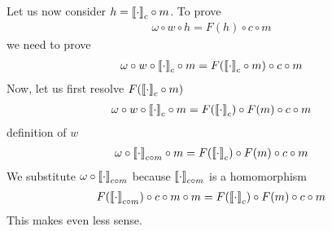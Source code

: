 Let us now consider $h={{\llbracket\cdot\rrbracket}}_{c}\circ m$. To prove
\begin{align}
    \omega \circ w \circ h = F(h)\circ c\circ m
\end{align}  
we need to prove 
\begin{align}
    \omega \circ w \circ {{\llbracket\cdot\rrbracket}}_{c}\circ m = F({{\llbracket\cdot\rrbracket}}_{c}\circ m)\circ c\circ m
\end{align}
Now, let us first resolve $F({{\llbracket\cdot\rrbracket}}_{c}\circ m)$
\begin{align}
    \omega \circ w \circ {{\llbracket\cdot\rrbracket}}_{c}\circ m = F({{\llbracket\cdot\rrbracket}}_{c})\circ F(m)\circ c\circ m
\end{align}
definition of $w$
\begin{align}
    \omega \circ{{\llbracket\cdot\rrbracket}}_{c\circ m}\circ m = F({{\llbracket\cdot\rrbracket}}_{c})\circ F(m)\circ c\circ m
\end{align}
We substitute $ \omega \circ{{\llbracket\cdot\rrbracket}}_{c\circ m}$ because ${{\llbracket\cdot\rrbracket}}_{c\circ m}$ is a homomorphism
\begin{align}
    F({{\llbracket\cdot\rrbracket}}_{c\circ m})\circ c\circ m \circ m = F({{\llbracket\cdot\rrbracket}}_{c})\circ F(m)\circ c\circ m
\end{align}
This makes even less sense.
\newpage
\begin{figure}[t]
    \centering
    \\
    \centering
\end{figure}
